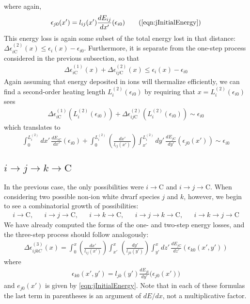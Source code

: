 \documentclass{article}
\begin{document}
where again,
\begin{align}
\epsilon_{j0}(x') = l_{ij}(x')\frac{dE_{ij}}{dx'}(\epsilon_{i0}) \tag{\ref{eqn:jInitialEnergy}}
\end{align}
This energy loss is again some subset of the total energy lost in that distance: $\Delta \epsilon_{i\text{C}}^{(2)}(x) \leq \epsilon_{i}(x) - \epsilon_{i0}$. Furthermore, it is separate from the one-step process considered in the previous subsection, so that
\begin{align}
\Delta \epsilon_{i\text{C}}^{(1)}(x) + \Delta \epsilon_{ij\text{C}}^{(2)}(x) \leq \epsilon_{i}(x) - \epsilon_{i0}
\end{align}
Again assuming that energy deposited in ions will thermalize efficiently, we can find a second-order heating length $L_i^{(2)}(\epsilon_{i0})$ by requiring that $x = L_i^{(2)}(\epsilon_{i0})$ sees
\begin{align}
\Delta \epsilon_{i\text{C}}^{(1)}\left( L_i^{(2)}(\epsilon_{i0}) \right) + \Delta \epsilon_{ij\text{C}}^{(2)}\left( L_i^{(2)}(\epsilon_{i0}) \right) \sim \epsilon_{i0}
\end{align}
which translates to
\begin{align}
\int_0^{L_i^{(2)}} dx'\, \frac{dE_{i\text{C}}}{dx'}(\epsilon_{i0}) + \int_0^{L_i^{(2)}} \left( \frac{dx'}{l_{ij}(x')} \right) \int_{x'}^{L_i^{(2)}} dy'\, \frac{dE_{j\text{C}}}{dy'}(\epsilon_{j0}(x')) \sim \epsilon_{i0}
\end{align}

\subsection{$i\to j\to k\to \text{C}$}

In the previous case, the only possibilities were $i\to\text{C}$ and $i\to j\to\text{C}$. When considering two possible non-ion white dwarf species $j$ and $k$, however, we begin to see a combinatorial growth of possibilities:
\begin{align}
i\to \text{C},  && i\to j\to\text{C},  && i\to k\to\text{C},  && i\to j\to k\to\text{C},  && i\to k\to j\to\text{C}
\end{align}
We have already computed the forms of the one- and two-step energy losses, and the three-step process should follow analogously:
\begin{align}
\Delta \epsilon_{ijkC}^{(3)}(x) = \int_0^x \left( \frac{dx'}{l_{ij}(x')} \right) \int_{x'}^x\, \left( \frac{dy'}{l_{jk}(y')} \right) \int_{y'}^x dz'\, \frac{dE_{j\text{C}}}{dz'}(\epsilon_{k0}(x',y'))
\end{align}
where
\begin{align}
\epsilon_{k0}(x',y') = l_{jk}(y')\frac{dE_{jk}}{dy'}\big(\epsilon_{j0}(x')\big)
\end{align}
and $e_{j0}(x')$ is given by \eqref{eqn:jInitialEnergy}. Note that in each of these formulas the last term in parentheses is an argument of $dE/dx$, not a multiplicative factor.
\end{document}
